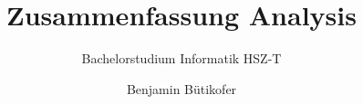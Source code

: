 \title{Zusammenfassung Analysis}
\subtitle{Bachelorstudium Informatik HSZ-T}
\author{Benjamin Bütikofer}